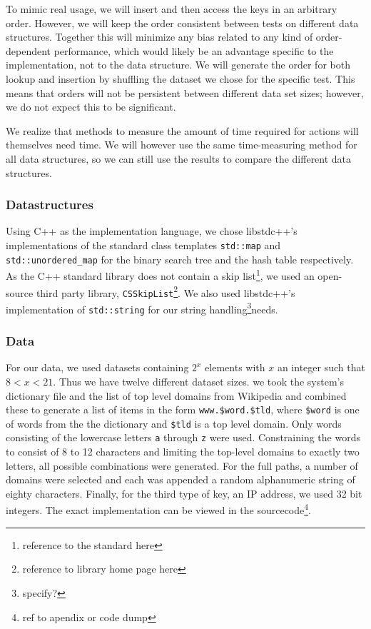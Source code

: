 \documentclass[12pt,a4paper]{article}
\begin{document}
	To mimic real usage, we will insert and then access the keys in an arbitrary order.  However, we will keep the order consistent 
    between tests on different data structures.  Together this will minimize any bias related to any kind of order-dependent 
    performance, which would likely be an advantage specific to the implementation, not to the data structure. We will 
    generate the order for both lookup and insertion by shuffling the dataset we chose for the specific test. This means that 
    orders will not be persistent between different data set sizes; however, we do not expect this to be significant.

	We realize that methods to measure the amount of time required for actions will themselves need time. We will however 
    use the same time-measuring method for all data structures, so we can still use the results to compare the different 
    data structures.
    
    \subsubsection*{Datastructures}

    Using C++ as the implementation language, we chose libstdc++'s implementations of the standard class
    templates \texttt{std::map} and \texttt{std::unordered\_map} for the binary search
    tree and the hash table respectively.  As the C++ standard library does not contain a skip
    list\footnote{reference to the standard here}, we used an open-source third party library,
    \texttt{CSSkipList}\footnote{reference to library home page here}.  We also used libstdc++'s
    implementation of \texttt{std::string} for our string handling\footnote{specify?}needs.
    
    \subsubsection*{Data}
    For our data, we used datasets containing $2^x$ elements with $x$ an integer such that $8 < x < 21$. Thus we have 
    twelve different dataset sizes. we took the system's dictionary file and the list of top level domains from Wikipedia 
    and combined these to generate a list of items in the form \texttt{www.\$word.\$tld}, where \texttt{\$word} is one 
    of words from the the dictionary and \texttt{\$tld} is a top level domain.  Only words consisting of the lowercase 
    letters \texttt{a} through \texttt{z} were used. Constraining the words to consist of 8 to 12 characters and limiting 
    the top-level domains to exactly two letters, all possible combinations were generated.  For the full paths, a number 
    of domains were selected and each was appended a random alphanumeric string of eighty characters.  Finally, for the 
    third type of key, an IP address, we used 32 bit integers. The exact implementation can be viewed in the 
    sourcecode\footnote{ref to apendix or code dump}.
\end{document}
